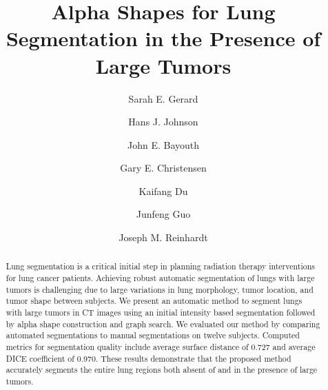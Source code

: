 \documentclass{llncs}
\begin{document}
%
\frontmatter          %
%
\pagestyle{headings}  %
%

%
%

\mainmatter              %
%
\title{Alpha Shapes for Lung Segmentation in the Presence of Large Tumors}
%
%
\author{
Sarah E. Gerard \and
Hans J. Johnson \and
John E. Bayouth \and
Gary E. Christensen \and
Kaifang Du \and
Junfeng Guo \and
Joseph M. Reinhardt
}
%
%
%


\maketitle              %


\begin{abstract}
Lung segmentation is a critical initial step in planning radiation therapy interventions for lung cancer patients. Achieving robust automatic segmentation of lungs with large tumors is challenging due to large variations in lung morphology, tumor location, and tumor shape between subjects. We present an automatic method to segment lungs with large tumors in CT images using an initial intensity based segmentation followed by alpha shape construction and graph search. We evaluated our method by comparing automated segmentations to manual segmentations on twelve subjects. Computed metrics for segmentation quality include average surface distance of 0.727 and average DICE coefficient of 0.970. These results demonstrate that the proposed method accurately segments the entire lung regions both absent of and in the presence of large tumors. 
\end{abstract}
%
\end{document}
